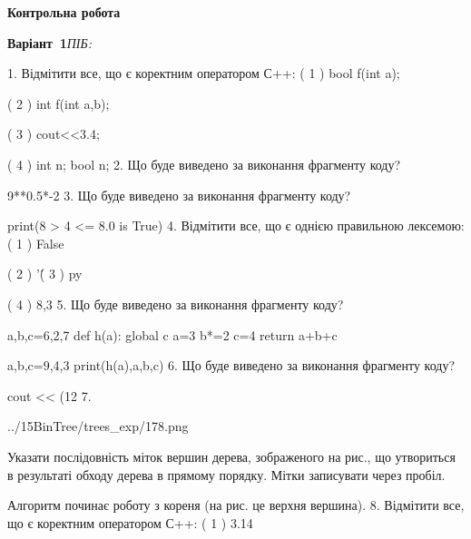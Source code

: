 \documentclass[11pt]{article}
\begin{document}
{\large\textbf{Контрольна робота}}

\textbf{Варіант \No\,1}\hfill \textit{ПІБ:}\,\underline{\hspace{60mm}}
\vspace{4mm}

1. %
Відмітити все, що є коректним оператором С++:
( 1 ) bool f(int a);

( 2 ) int f(int a,b);

( 3 ) cout<<3.4;

( 4 ) int n; bool n;
\vspace{5mm}
2. Що буде виведено за виконання фрагменту коду?

9**0.5*-2
\vspace{5mm}
3. Що буде виведено за виконання фрагменту коду?

print(8 > 4 <= 8.0 is True)
\vspace{5mm}
4. %
Відмітити все, що є однією правильною лексемою:
( 1 ) False

( 2 ) '\'

( 3 ) py

( 4 ) 8,3
\vspace{5mm}
5. Що буде виведено за виконання фрагменту коду?

a,b,c=6,2,7
def h(a):
global c    a=3
    b*=2
    c=4
    return a+b+c

a,b,c=9,4,3
print(h(a),a,b,c)
\vspace{5mm}
6. Що буде виведено за виконання фрагменту коду?

cout << (12 %
\vspace{5mm}
7. 

\begin{center}
	{../15BinTree/trees_exp/178.png}
\end{center}
Указати послідовність міток вершин дерева, зображеного на рис., що утвориться в результаті обходу дерева в прямому порядку. Мітки записувати через пробіл.\par Алгоритм починає роботу з кореня (на рис. це верхня вершина).
\vspace{5mm}
8. %
Відмітити все, що є коректним оператором С++:
( 1 ) 3.14%
\end{document}
